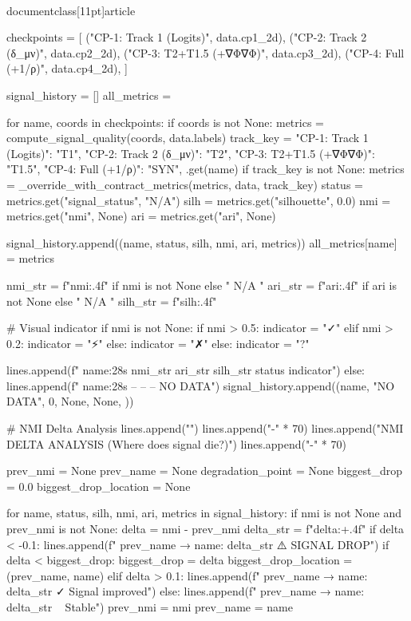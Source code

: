 \\documentclass[11pt]{article}
\begin{document}
\begin{CodeBlock}
    checkpoints = [
        ("CP-1: Track 1 (Logits)", data.cp1_2d),
        ("CP-2: Track 2 (δ_μν)", data.cp2_2d),
        ("CP-3: T2+T1.5 (+∇Φ∇Φ)", data.cp3_2d),
        ("CP-4: Full (+1/ρ)", data.cp4_2d),
    ]

    signal_history = []
    all_metrics = {}

    for name, coords in checkpoints:
        if coords is not None:
            metrics = compute_signal_quality(coords, data.labels)
            track_key = {
                "CP-1: Track 1 (Logits)": "T1",
                "CP-2: Track 2 (δ_μν)": "T2",
                "CP-3: T2+T1.5 (+∇Φ∇Φ)": "T1.5",
                "CP-4: Full (+1/ρ)": "SYN",
            }.get(name)
            if track_key is not None:
                metrics = _override_with_contract_metrics(metrics, data, track_key)
            status = metrics.get("signal_status", "N/A")
            silh = metrics.get("silhouette", 0.0)
            nmi = metrics.get("nmi", None)
            ari = metrics.get("ari", None)

            signal_history.append((name, status, silh, nmi, ari, metrics))
            all_metrics[name] = metrics

            nmi_str = f"{nmi:.4f}" if nmi is not None else "  N/A "
            ari_str = f"{ari:.4f}" if ari is not None else "  N/A "
            silh_str = f"{silh:.4f}"

            # Visual indicator
            if nmi is not None:
                if nmi > 0.5:
                    indicator = "✓"
                elif nmi > 0.2:
                    indicator = "⚡"
                else:
                    indicator = "✗"
            else:
                indicator = "?"

            lines.append(f"  {name:28s}  {nmi_str}   {ari_str}   {silh_str}   {status} {indicator}")
        else:
            lines.append(f"  {name:28s}    --       --       --      NO DATA")
            signal_history.append((name, "NO DATA", 0, None, None, {}))

    # NMI Delta Analysis
    lines.append("")
    lines.append("-" * 70)
    lines.append("NMI DELTA ANALYSIS (Where does signal die?)")
    lines.append("-" * 70)

    prev_nmi = None
    prev_name = None
    degradation_point = None
    biggest_drop = 0.0
    biggest_drop_location = None

    for name, status, silh, nmi, ari, metrics in signal_history:
        if nmi is not None and prev_nmi is not None:
            delta = nmi - prev_nmi
            delta_str = f"{delta:+.4f}"
            if delta < -0.1:
                lines.append(f"  {prev_name} → {name}: {delta_str}  ⚠️  SIGNAL DROP")
                if delta < biggest_drop:
                    biggest_drop = delta
                    biggest_drop_location = (prev_name, name)
            elif delta > 0.1:
                lines.append(f"  {prev_name} → {name}: {delta_str}  ✓ Signal improved")
            else:
                lines.append(f"  {prev_name} → {name}: {delta_str}  ~ Stable")
        prev_nmi = nmi
        prev_name = name


\end{CodeBlock}
\end{document}
